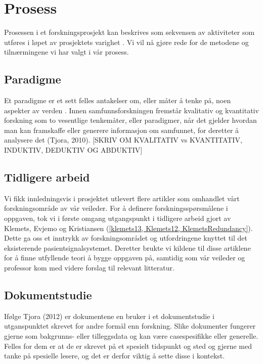 \section{Prosess}
\label{chp: prosess}

Prosessen i et forskningsprosjekt kan beskrives som sekvensen av aktiviteter som utføres i løpet av prosjektets varighet \cite{Oates}. Vi vil nå gjøre rede for de metodene og tilnærmingene vi har valgt i vår prosess.

\subsection{Paradigme}
Et paradigme er et sett felles antakelser om, eller måter å tenke på, noen aspekter av verden \cite{Oates}. Innen samfunnsforskningen fremstår kvalitativ og kvantitativ forskning som to vesentlige tenkemåter, eller paradigmer, når det gjelder hvordan man kan framskaffe eller generere informasjon om samfunnet, for deretter å analysere det (Tjora, 2010).
[SKRIV OM KVALITATIV vs KVANTITATIV, INDUKTIV, DEDUKTIV OG ABDUKTIV]

\subsection{Tidligere arbeid}
Vi fikk innledningsvis i prosjektet utlevert flere artikler som omhandlet vårt forskningsområde av vår veileder. For å definere forskningsspørsmålene i oppgaven, tok vi i første omgang utgangspunkt i tidligere arbeid gjort av Klemets, Evjemo og Kristiansen (\ref{klemets13, Klemets12, KlemetsRedundancy}). Dette ga oss et inntrykk av forskningsområdet og utfordringene knyttet til det eksisterende pasientsignalsystemet. Deretter brukte vi kildene til disse artiklene for å finne utfyllende teori å bygge oppgaven på, samtidig som vår veileder og professor kom med videre forslag til relevant litteratur.  

\subsection{Dokumentstudie}
Ifølge Tjora (2012) er dokumentene en bruker i et dokumentstudie i utganspunktet skrevet for andre formål enn forskning. Slike dokumenter fungerer gjerne som bakgrunns- eller tilleggsdata og kan være casespesifikke eller generelle. Felles for dem er at de er skrevet på et spesielt tidspunkt og sted og gjerne med tanke på spesielle lesere, og det er derfor viktig å sette disse i kontekst. 

